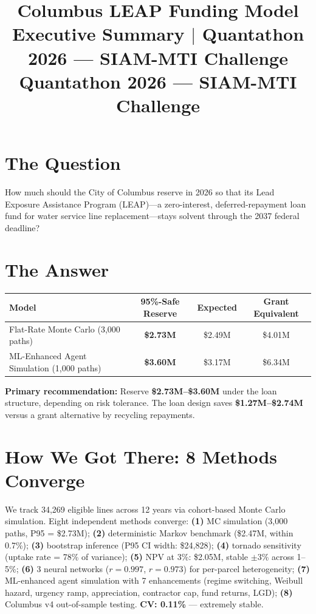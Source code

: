 \documentclass[11pt, letterpaper]{article}
\title{
    \vspace{-1.5cm}
    \textbf{Columbus LEAP Funding Model} \\[0.2cm]
    \large Executive Summary \(\mid\) Quantathon 2026 --- SIAM-MTI Challenge \\[0.1cm]
    \normalsize Quantathon 2026 --- SIAM-MTI Challenge
}
\author{}
\date{}
\begin{document}
\maketitle
\thispagestyle{fancy}
\vspace{-0.5cm}

\section*{The Question}

How much should the City of Columbus reserve in 2026 so that its Lead Exposure Assistance Program (LEAP)---a zero-interest, deferred-repayment loan fund for water service line replacement---stays solvent through the 2037 federal deadline?

\vspace{-0.2cm}
\section*{The Answer}

\begin{center}
\renewcommand{\arraystretch}{1.3}
\begin{tabular}{@{}lccc@{}}
\toprule
\textbf{Model} & \textbf{95\%-Safe Reserve} & \textbf{Expected} & \textbf{Grant Equivalent} \\
\midrule
Flat-Rate Monte Carlo (3{,}000 paths) & \textbf{\$2.73M} & \$2.49M & \$4.01M \\
ML-Enhanced Agent Simulation (1{,}000 paths) & \textbf{\$3.60M} & \$3.17M & \$6.34M \\
\bottomrule
\end{tabular}
\end{center}

\noindent \textbf{Primary recommendation:} Reserve \textbf{\$2.73M--\$3.60M} under the loan structure, depending on risk tolerance. The loan design saves \textbf{\$1.27M--\$2.74M} versus a grant alternative by recycling repayments.

\vspace{-0.2cm}
\section*{How We Got There: 8 Methods Converge}

We track 34{,}269 eligible lines across 12 years via cohort-based Monte Carlo simulation. Eight independent methods converge: \textbf{(1)} MC simulation (3{,}000 paths, P95 = \$2.73M); \textbf{(2)} deterministic Markov benchmark (\$2.47M, within 0.7\%); \textbf{(3)} bootstrap inference (P95 CI width: \$24{,}828); \textbf{(4)} tornado sensitivity (uptake rate = 78\% of variance); \textbf{(5)} NPV at 3\%: \$2.05M, stable $\pm$3\% across 1--5\%; \textbf{(6)} 3 neural networks ($r{=}0.997$, $r{=}0.973$) for per-parcel heterogeneity; \textbf{(7)} ML-enhanced agent simulation with 7 enhancements (regime switching, Weibull hazard, urgency ramp, appreciation, contractor cap, fund returns, LGD); \textbf{(8)} Columbus v4 out-of-sample testing. \textbf{CV: 0.11\%} --- extremely stable.
\end{document}
